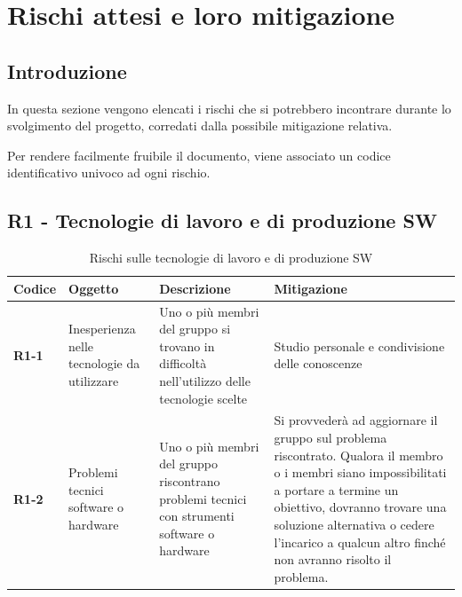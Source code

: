\documentclass[a4paper,12pt]{article}
\begin{document}
\newpage
\section{Rischi attesi e loro mitigazione}
\label{sec:rischi}
    \subsection{Introduzione}
        In questa sezione vengono elencati i rischi che si potrebbero incontrare durante lo svolgimento del progetto, corredati dalla possibile mitigazione relativa.
        
        Per rendere facilmente fruibile il documento, viene associato un codice identificativo univoco ad ogni rischio.
    \subsection{R1 - Tecnologie di lavoro e di produzione SW}
        \begin{table}[H]
        \label{tab:r1} 
            \begin{tabularx}{\textwidth}{|l|L|L|L|}
            \hline
            \textbf{Codice} & \textbf{Oggetto} & \textbf{Descrizione} & \textbf{Mitigazione}\\
            \hline
            \textbf{R1-1} & Inesperienza nelle tecnologie da utilizzare & Uno o più membri del gruppo si trovano in difficoltà nell'utilizzo delle tecnologie scelte & Studio personale e condivisione delle conoscenze\\
            \hline
            \textbf{R1-2} & Problemi tecnici software o hardware & Uno o più membri del gruppo riscontrano problemi tecnici con strumenti software o hardware & Si provvederà ad aggiornare il gruppo sul problema riscontrato. Qualora il membro o i membri siano impossibilitati a portare a termine un obiettivo, dovranno trovare una soluzione alternativa o cedere l'incarico a qualcun altro finché non avranno risolto il problema.\\            
            \hline
            \end{tabularx}
            \caption{Rischi sulle tecnologie di lavoro e di produzione SW}
        \end{table}
        
\end{document}
